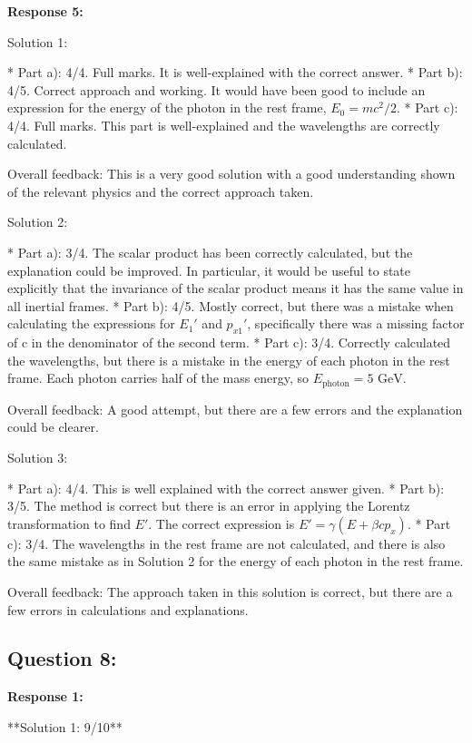 \documentclass[a4paper,11pt]{article}
\begin{document}
\bigskip    
\textbf{Response 5:}

Solution 1:

* Part a): 4/4. Full marks. It is well-explained with the correct answer.
* Part b): 4/5. Correct approach and working. It would have been good to include an expression for the energy of the photon in the rest frame, $E_0 = mc^2/2$.
* Part c): 4/4. Full marks. This part is well-explained and the wavelengths are correctly calculated.

Overall feedback: This is a very good solution with a good understanding shown of the relevant physics and the correct approach taken.

Solution 2:

* Part a): 3/4. The scalar product has been correctly calculated, but the explanation could be improved. In particular, it would be useful to state explicitly that the invariance of the scalar product means it has the same value in all inertial frames.
* Part b): 4/5. Mostly correct, but there was a mistake when calculating the expressions for $E_1'$ and $p_{x1}'$, specifically there was a missing factor of c in the denominator of the second term.
* Part c): 3/4. Correctly calculated the wavelengths, but there is a mistake in the energy of each photon in the rest frame. Each photon carries half of the mass energy, so $E_{\text{photon}} = 5 \text{ GeV}$. 

Overall feedback: A good attempt, but there are a few errors and the explanation could be clearer.

Solution 3:

* Part a): 4/4. This is well explained with the correct answer given.
* Part b): 3/5. The method is correct but there is an error in applying the Lorentz transformation to find $E'$. The correct expression is $E' = \gamma(E + \beta cp_x)$.
* Part c): 3/4. The wavelengths in the rest frame are not calculated, and there is also the same mistake as in Solution 2 for the energy of each photon in the rest frame.

Overall feedback: The approach taken in this solution is correct, but there are a few errors in calculations and explanations.

\subsection*{Question 8:}

\textbf{Response 1:}

**Solution 1: 9/10**
\end{document}
